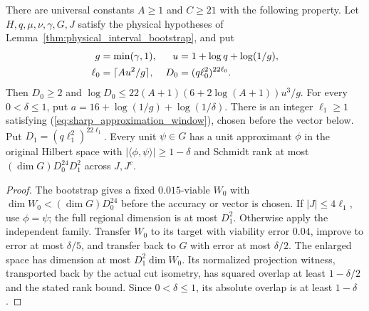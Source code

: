 \begin{lemma}
    \label{thm:physical_dg_normalized_approximation_independent}
    \leanok
    There are universal constants $A\ge1$ and $C\ge21$ with the following
    property. Let $H,q,\mu,\nu,\gamma,G,J$ satisfy the physical hypotheses
    of Lemma~\ref{thm:physical_interval_bootstrap}, and put
    \begin{align}
        g      & =\min(\gamma,1),      & u   & =1+\log q+\log(1/g),\notag \\
        \ell_0 & =\lceil Au^2/g\rceil, & D_0 & =(q\ell_0^2)^{22\ell_0}.
    \end{align}
    Then $D_0\ge2$ and
    $\log D_0\le22(A+1)(6+2\log(A+1))u^3/g$.
    For every $0<\delta\le1$, put $a=16+\log(1/g)+\log(1/\delta)$.
    There is an integer $\ell_1\ge1$ satisfying
    (\ref{eq:sharp_approximation_window}), chosen before the vector below.
    Put $D_1=(q\ell_1^2)^{22\ell_1}$.
    Every unit $\psi\in G$ has a unit approximant $\phi$ in the original
    Hilbert space with
    $|\langle\phi,\psi\rangle|\ge1-\delta$ and Schmidt rank at most
    $(\dim G)D_0^{24}D_1^2$ across $J,J^c$.
\end{lemma}
\begin{proof}
    \leanok
    The bootstrap gives a fixed $0.015$-viable $W_0$ with
    $\dim W_0<(\dim G)D_0^{24}$ before the accuracy or vector is chosen.
    If $|J|\le4\ell_1$, use $\phi=\psi$; the full regional dimension
    is at most $D_1^2$.
    Otherwise apply the independent family. Transfer $W_0$ to its target
    with viability error $0.04$, improve to error at most $\delta/5$,
    and transfer back to $G$ with error at most $\delta/2$.
    The enlarged space has dimension at most $D_1^2\dim W_0$.
    Its normalized projection witness, transported back by the actual
    cut isometry, has squared overlap at least $1-\delta/2$ and the stated
    rank bound. Since $0<\delta\le1$, its absolute overlap is at least
    $1-\delta$.
\end{proof}

